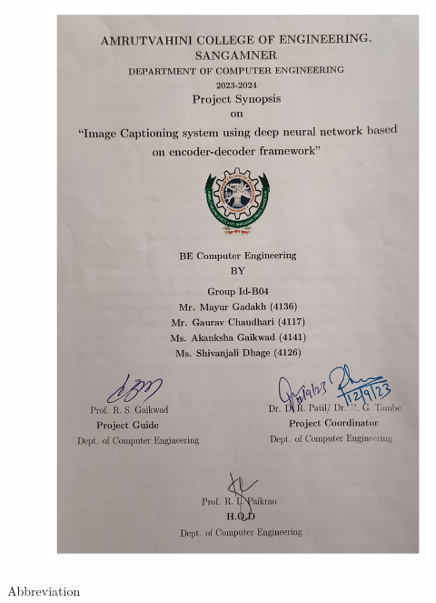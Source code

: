 \documentclass[oneside,a4paper,12pt]{report}
\begin{document}
\begin{figure}[H]
\begin{center}
\includegraphics[width=1.010\linewidth]{sys12}
\label{Fig:f4}
\end{center}
\end{figure}

\newpage
{}
\newpage
{\fontsize{16}{15} \bfseries \LARGE \selectfont \centerline{Abbreviation}}
\vspace{10mm}
\end{document}
